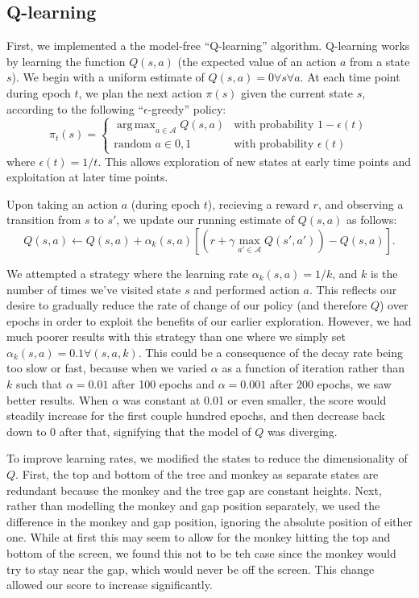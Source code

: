 \documentclass[11pt]{amsart}
\DeclareMathOperator*{\argmax}{arg\,max}
\begin{document}
\subsection{Q-learning}

First, we implemented a the model-free ``Q-learning'' algorithm. Q-learning works
by learning the function $Q(s,a)$ (the expected value of an action $a$ from a 
state $s$). We begin with a uniform estimate of $Q(s,a) = 0 \forall s \forall a$.
At each time point during epoch $t$, we plan the next action $\pi(s)$ given the 
current state $s$, according to the following ``$\epsilon$-greedy'' policy:
$$\pi_t(s) = \begin{cases} 
\argmax_{a \in \mathcal{A}} Q(s,a) & \text{with probability } 1-\epsilon(t) \\
\text{random } a \in {0,1}         & \text{with probability } \epsilon(t) 
\end{cases}$$
where $\epsilon(t) = 1/t$. This allows exploration of new states at early time 
points and exploitation at later time points.

Upon taking an action $a$ (during epoch $t$), recieving a reward $r$, and observing a transition from $s$
to $s'$, we update our running estimate of $Q(s,a)$ as follows:
$$Q(s,a) \gets Q(s,a) + \alpha_k(s,a) \left[ (r + \gamma \max_{a' \in \mathcal{A}} Q(s', a')) - Q(s,a) \right].$$

We attempted a strategy where the learning rate $\alpha_k(s,a) = 1/k$, and $k$ is the number of times we've visited state $s$ and performed action $a$. This reflects our desire to gradually reduce the rate of change of our policy (and therefore $Q$) over epochs in order to exploit the benefits of our earlier exploration. However, we had much poorer results with this strategy than one where we simply set $\alpha_k(s,a) = 0.1 \forall(s,a,k)$. This could be a consequence of the decay rate being too slow or fast, because when we varied $\alpha$ as a function of iteration rather than $k$ such that $\alpha=0.01$ after 100 epochs and $\alpha=0.001$ after 200 epochs, we saw better results. When $\alpha$ was constant at 0.01 or even smaller, the score would steadily increase for the first couple hundred epochs, and then decrease back down to 0 after that, signifying that the model of $Q$ was diverging.

To improve learning rates, we modified the states to reduce the dimensionality of $Q$. First, the top and bottom of the tree and monkey as separate states are redundant because the monkey and the tree gap are constant heights. Next, rather than modelling the monkey and gap position separately, we used the difference in the monkey and gap position, ignoring the absolute position of either one. While at first this may seem to allow for the monkey hitting the top and bottom of the screen, we found this not to be teh case since the monkey would try to stay near the gap, which would never be off the screen. This change allowed our score to increase significantly.
\end{document}
